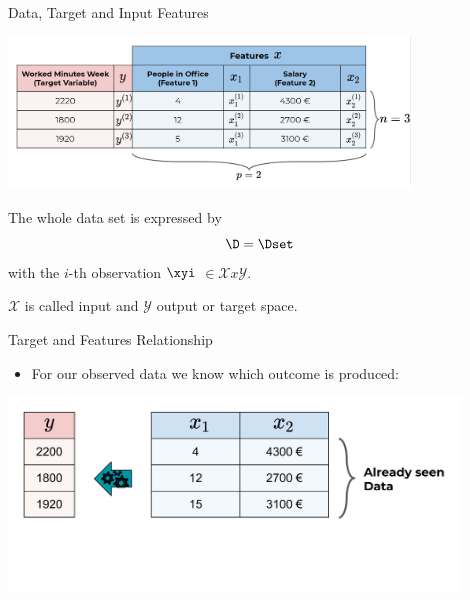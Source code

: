 \begin{frame}{Data, Target and Input Features}

\scriptsize

\begin{center}\includegraphics[width=0.8\textwidth]{plots/data_table} \end{center}

\normalsize 

\vspace{-0.5cm}

The whole data set is expressed by \[
\D = \Dset
\] with the \(i\)-th observation \(\xyi\) $\in \mathcal{X}x\mathcal{Y}$.

$\mathcal{X}$ is called input and $\mathcal{Y}$ output or target space.

\end{frame}


\begin{frame}{Target and Features Relationship}

\begin{itemize}

\item
  For our observed data we know which outcome is produced:
\end{itemize}

\vspace{-0.5cm}

\scriptsize

\begin{center}\includegraphics[width=0.9\textwidth]{plots/new_data0_web} \end{center}

\normalsize 

\end{frame}

